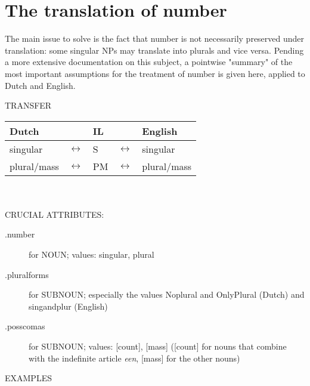 \section{The translation of number}
\label{number}

The main issue to solve is the fact that number is not necessarily preserved 
under
translation: some singular NPs may translate into plurals and vice versa.
Pending a more extensive documentation on this subject, a pointwise 
"summary" of the most important assumptions for the treatment of number is 
given here, applied to Dutch and English.

TRANSFER\\ 

\begin{tabular}{|lllll|} \hline
Dutch && IL & &  English \\ \hline \hline

singular & $\leftrightarrow$  & S  & $\leftrightarrow$ & singular \\ \hline
 
plural/mass & $\leftrightarrow$  &  PM  & $\leftrightarrow$  & plural/mass
 \\ \hline
\end{tabular}\\ \\

CRUCIAL ATTRIBUTES:
\begin{description}
\item[.number] for NOUN; values: singular, plural
\item[.pluralforms] for SUBNOUN;  especially the values Noplural and OnlyPlural 
(Dutch) and singandplur (English)
\item[.posscomas] for  SUBNOUN; values: [count], [mass]
([count] for nouns that combine with the indefinite article {\em een}, [mass] 
for the other nouns)
\end{description}


EXAMPLES\\ 

